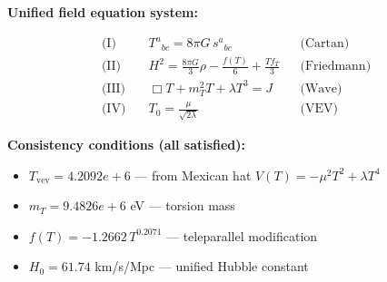 
\textbf{Unified field equation system:}

\begin{align}
  \text{(I)} \quad & T^a{}_{bc} = 8\pi G \, s^a{}_{bc} && \text{(Cartan)} \\
  \text{(II)} \quad & H^2 = \frac{8\pi G}{3}\rho - \frac{f(T)}{6} + \frac{Tf_T}{3} && \text{(Friedmann)} \\
  \text{(III)} \quad & \Box T + m_T^2 T + \lambda T^3 = J && \text{(Wave)} \\
  \text{(IV)} \quad & T_0 = \frac{\mu}{\sqrt{2\lambda}} && \text{(VEV)}
\end{align}

\textbf{Consistency conditions (all satisfied):}
\begin{itemize}
  \item $T_{\text{vev}} = 4.2092e+6$ — from Mexican hat $V(T) = -\mu^2 T^2 + \lambda T^4$
  \item $m_T = 9.4826e+6$ eV — torsion mass
  \item $f(T) = -1.2662 \, T^{0.2071}$ — teleparallel modification
  \item $H_0 = 61.74$ km/s/Mpc — unified Hubble constant
\end{itemize}